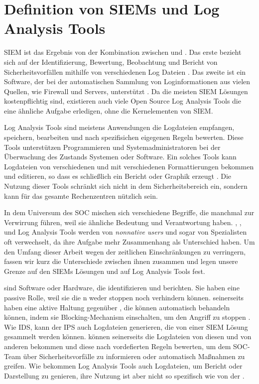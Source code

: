 \section{Definition von SIEMs und Log Analysis Tools}

\gls{SIEM} ist das Ergebnis von der Kombination zwischen  und  \citep{Dorigo_SIEM}. Das erste bezieht sich auf der Identifizierung, Bewertung, Beobachtung und Bericht von Sicherheitsvorfällen mithilfe von verschiedenen Log Dateien \citep{techopedia_SEM}. Das zweite ist ein Software, der bei der automatischen Sammlung von Loginformationen aus vielen Quellen, wie Firewall und Servers, unterstützt \citep{techopedia_SIM}. Da die meisten \gls{SIEM} Lösungen kostenpflichtig sind, existieren auch viele \gls{Open Source} Log Analysis Tools die eine ähnliche Aufgabe erledigen, ohne die Kernelementen von \gls{SIEM}.

Log Analysis Tools sind meistens Anwendungen die Logdateien empfangen, speichern, bearbeiten und nach spezifisichen eigegenen Regeln bewerten. Diese Tools unterstützen Programmieren und Systemadministratoren bei der Überwachung des Zustands Systemen oder Software. Ein solches Tools kann Logdateien von verschiedenen  und mit verschiedenen Formattierungen bekommen und editieren, so dass es schließlich ein Bericht oder Graphik erzeugt \citep{Korzeniowski_LATDef}. Die Nutzung dieser Tools schränkt sich nicht in dem Sicherheitsbereich ein, sondern kann für das gesamte Rechenzentren nützlich sein.

In dem Universum des \gls{SOC} mischen sich verschiedene Begriffe, die manchmal zur Verwirrung führen, weil sie ähnliche Bedeutung und Verantwortung haben. , ,  und Log Analysis Tools werden von \textit{nonnative users} und sogar von Spezialisten oft verwechselt, da ihre Aufgabe mehr Zusammenhang als Unterschied haben. Um den Umfang dieser Arbeit wegen der zeitlichen Einschränkungen zu verringern, fassen wir kurz die Unterschiede zwischen ihnen zusammen und legen unsere Grenze auf den \glspl{SIEM} Lösungen und auf Log Analysis Tools fest.

\newpage
{} sind Software oder Hardware, die  identifizieren und berichten. Sie haben eine passive Rolle, weil sie die n weder stoppen noch verhindern können.  seinerseits haben eine aktive Haltung gegenüber , die können automatisch behandeln können, indem sie Blocking-Mechanism einschalten, um den Angriff zu stoppen \citep{Wendzel_IS}. Wie \gls{IDS}, kann der \gls{IPS} auch Logdateien generieren, die von einer \gls{SIEM} Lösung gesammelt werden können.  können seinerseits die Logdateien von diesen und von anderen  bekommen und diese nach vordefierten Regeln bewerten, um dem \gls{SOC}-Team über Sicherheitsvorfälle zu informieren oder automatisch Maßnahmen zu greifen. Wie  bekommen Log Analysis Tools auch Logdateien, um Bericht oder Darstellung zu genieren, ihre Nutzung ist aber nicht so spezifisch wie von der .

